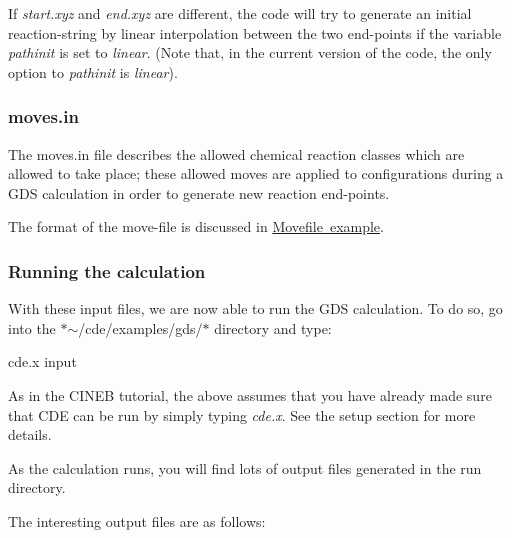 If {\itshape start.\+xyz} and {\itshape end.\+xyz} are different, the code will try to generate an initial reaction-\/string by linear interpolation between the two end-\/points if the variable {\itshape pathinit} is set to {\itshape linear}. (Note that, in the current version of the code, the only option to {\itshape pathinit} is {\itshape linear}).

\subsubsection*{moves.\+in}

The moves.\+in file describes the allowed chemical reaction classes which are allowed to take place; these allowed moves are applied to configurations during a G\+DS calculation in order to generate new reaction end-\/points.

The format of the move-\/file is discussed in \mbox{\hyperlink{moves}{Movefile example}}.

\subsubsection*{Running the calculation}

With these input files, we are now able to run the G\+DS calculation. To do so, go into the $\ast$$\sim$/cde/examples/gds/$\ast$ directory and type\+: \begin{DoxyVerb}cde.x input
\end{DoxyVerb}


As in the C\+I\+N\+EB tutorial, the above assumes that you have already made sure that C\+DE can be run by simply typing {\itshape cde.\+x}. See the setup section for more details.

As the calculation runs, you will find lots of output files generated in the run directory.

The interesting output files are as follows\+:



